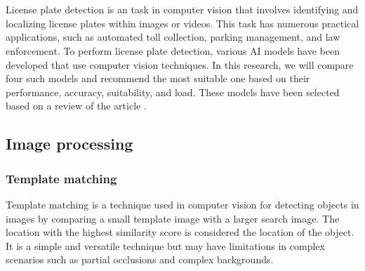 \chapter{}
\label{chap:license-plate-recognition}

License plate detection is an task in computer vision that involves identifying and localizing license plates within images or videos. 
This task has numerous practical applications, such as automated toll collection, parking management, and law enforcement. 
To perform license plate detection, various AI models have been developed that use computer vision techniques. 
In this research, we will compare four such models and recommend the most suitable one based on their performance, accuracy, suitability, and load. 
These models have been selected based on a review of the article \cite{lic:license-plate}.

\section{Image processing}

    \subsection{Template matching}
    Template matching is a technique used in computer vision for detecting objects in images by comparing a small template image with a larger search image. 
    The location with the highest similarity score is considered the location of the object. 
    It is a simple and versatile technique but may have limitations in complex scenarios such as partial occlusions and complex backgrounds.

